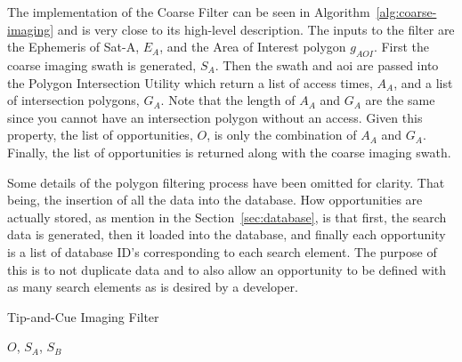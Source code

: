 The implementation of the Coarse Filter can be seen in
Algorithm~\ref{alg:coarse-imaging} and is very close to its high-level
description. The inputs to the filter are the Ephemeris of Sat-A, $E_A$, and
the Area of Interest polygon $g_{AOI}$. First the coarse imaging swath is
generated, $S_A$. Then the swath and \gls{aoi} are passed into the Polygon
Intersection Utility which return a list of access times, $A_{A}$, and a list
of intersection polygons, $G_A$. Note that the length of $A_{A}$ and $G_A$
are the same since you cannot have an intersection polygon without an access.
Given this property, the list of opportunities, $O$, is only the combination of
$A_{A}$ and $G_A$. Finally, the list of opportunities is returned along with
the coarse imaging swath. 

Some details of the polygon filtering process have been omitted for clarity.
That being, the insertion of all the data into the database. How opportunities
are actually stored, as mention in the Section~\ref{sec:database}, is that
first, the search data is generated, then it loaded into the database, and
finally each opportunity is a list of database ID's corresponding to each
search element. The purpose of this is to not duplicate data and to also allow
an opportunity to be defined with as many search elements as is desired by a
developer.


\begin{algorithm} 
    \caption{Tip-and-Cue Imaging Filter}
    \label{alg:tip-and-cue} 
    \begin{algorithmic}[1] 

	     
	     

	     




		 


		\EndIf

	    \EndFor

	\State \Return $O$, $S_A$, $S_B$
	\EndFunction
    \end{algorithmic}
\end{algorithm}

